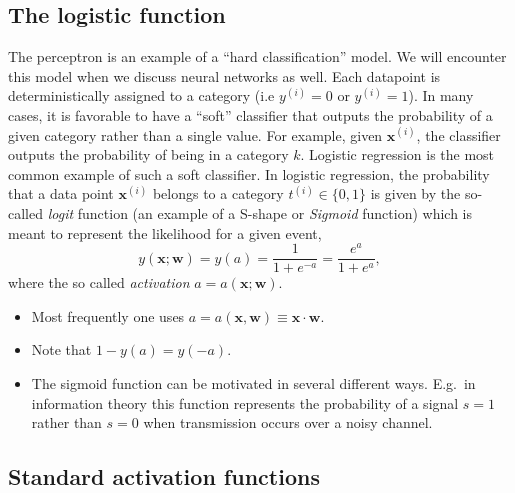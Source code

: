 \documentclass[%
oneside,                 %
final,                   %
10pt]{article}
\begin{document}
\subsection{The logistic function}

The perceptron is an example of a ``hard classification'' model. We
will encounter this model when we discuss neural networks as
well. Each datapoint is deterministically assigned to a category (i.e
$y^{(i)}=0$ or $y^{(i)}=1$). In many cases, it is favorable to have a ``soft''
classifier that outputs the probability of a given category rather
than a single value. For example, given $\boldsymbol{x}^{(i)}$, the classifier
outputs the probability of being in a category $k$.  Logistic regression
is the most common example of such a soft classifier. In logistic
regression, the probability that a data point $\boldsymbol{x}^{(i)}$
belongs to a category $t^{(i)} \in \{0,1\}$ is given by the so-called \emph{logit} function (an example of a S-shape or \emph{Sigmoid} function) which is meant to represent the likelihood for a given event, 
\[
y(\boldsymbol{x}; \boldsymbol{w}) = y(a) = \frac{1}{1+e^{-a}} = \frac{e^a}{1+e^a},
\]
where the so called \emph{activation} $a = a(\boldsymbol{x}; \boldsymbol{w})$. 

\begin{itemize}
\item Most frequently one uses $a = a(\boldsymbol{x}, \boldsymbol{w}) \equiv \boldsymbol{x} \cdot \boldsymbol{w}$.

\item Note that $1-y(a)= y(-a)$.

\item The sigmoid function can be motivated in several different ways. E.g.~in information theory this function represents the probability of a signal $s=1$ rather than $s=0$ when transmission occurs over a noisy channel.
\end{itemize}

\noindent
\subsection{Standard activation functions}
\end{document}
